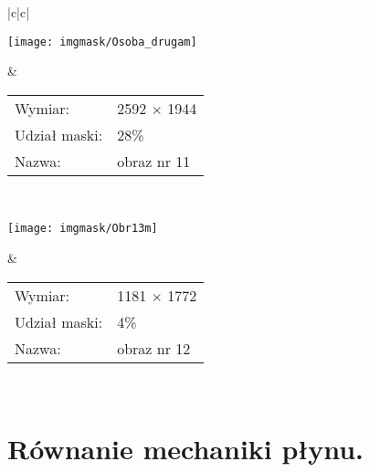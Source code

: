 \documentclass[a4paper,12pt,twoside,openany]{report}
\def \fullOsobaDrugam{obraz nr 11}
\def \fullObrXIIIm{obraz nr 12}
\begin{document}
\begin{longtable}[h!]{|c|c|}
    \begin{minipage}{.65\textwidth}
    \vspace{0.2cm}
    \centering
    \texttt{[image: imgmask/Osoba\_drugam]}
    \vspace{0.2cm}
    \end{minipage}
    &
    \begin{minipage}{.35\textwidth}
    \begin{tabular}{ l l  }
	Wymiar: & 2592 $\times$ 1944 \\
	Udział maski: & 28\% \\
	Nazwa: & \fullOsobaDrugam
    \end{tabular}
    \end{minipage} \\ \hline
    
    \begin{minipage}{.65\textwidth}
    \vspace{0.2cm}
    \centering
    \texttt{[image: imgmask/Obr13m]}
    \vspace{0.2cm}
    \end{minipage}
    &
    \begin{minipage}{.35\textwidth}
    \begin{tabular}{ l l  }
	Wymiar: & 1181 $\times$ 1772 \\
	Udział maski: & 4\% \\
	Nazwa: & \fullObrXIIIm
    \end{tabular}
    \end{minipage} \\ \hline
    \caption{Obrazy poddane analizie.}
  \label{imgmasks}
\end{longtable}
\section{Równanie mechaniki płynu.}
\label{sec:NVResult}
\end{document}
